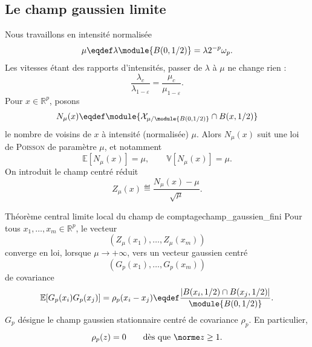 \subsection{Le champ gaussien limite}

Nous travaillons en intensité normalisée
\[
    \mu \eqdef \lambda \module{B(0,1/2)}  = \lambda 2^{-p}\omega_p .
\]
Les vitesses étant des rapports d'intensités, passer de $\lambda$ à $\mu$ ne change rien :
\[
    \frac{\lambda_c}{\lambda_{1-\varepsilon}}
    =
    \frac{\mu_c}{\mu_{1-\varepsilon}}.
\]
Pour $x\in\mathbb R^p$, posons
\[
    N_\mu(x)
    \eqdef
    \module{\mathcal X_{\mu/\module{B(0,1/2)}}\cap B(x,1/2)}
\]
le nombre de voisins de $x$ à intensité (normalisée) $\mu$.
Alors $N_\mu(x)$ suit une loi de \textsc{Poisson} de paramètre $\mu$, et notamment
\[
    \mathbb E[N_\mu(x)]=\mu,
    \qquad
    \mathbb V[N_\mu(x)]=\mu.
\]
On introduit le champ centré réduit
\[
    Z_\mu(x)
    \eqdef
    \frac{N_\mu(x)-\mu}{\sqrt\mu}.
\]

\begin{Fait}{Théorème central limite local du champ de comptage}{champ_gaussien_fini}
Pour tous $x_1,\ldots,x_m\in\mathbb R^p$, le vecteur
\[
    \left(Z_\mu(x_1),\ldots,Z_\mu(x_m)\right)
\]
converge en loi, lorsque $\mu\to+\infty$, vers un vecteur gaussien centré
\[
    \left(G_p(x_1),\ldots,G_p(x_m)\right)
\]
de covariance
\[
    \mathbb E[G_p(x_i)G_p(x_j)]
    =
    \rho_p(x_i-x_j)
    \eqdef
    \frac{|B(x_i,1/2)\cap B(x_j,1/2)|}{\module{B(0,1/2)}}.
\]
$G_p$ désigne le champ gaussien stationnaire centré de covariance $\rho_p$. En particulier,
\[
    \rho_p(z)=0
    \qquad\text{dès que }\norme z\ge1.
\]
\end{Fait}

